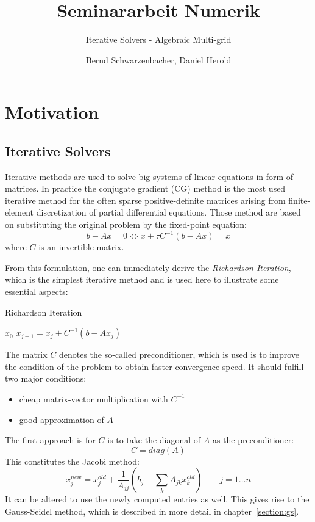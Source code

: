 \documentclass[a4paper,11pt]{scrartcl}
\title{Seminararbeit Numerik}
\subtitle{Iterative Solvers - Algebraic Multi-grid}
\author{Bernd Schwarzenbacher, Daniel Herold}
\begin{document}
\maketitle
\tableofcontents
\pagebreak

\section{Motivation} \label{section:motiv}
\subsection{Iterative Solvers} \label{section:iter}
Iterative methods are used to solve big systems of linear equations in form of
matrices.
In practice the conjugate gradient (CG) method is the most used iterative method for
the often sparse positive-definite matrices arising from finite-element
discretization of partial differential equations.
Those method are based on substituting the original problem by the fixed-point
equation:
$$b-Ax = 0 \iff x + \tau C^{-1} (b-Ax) = x$$
where $C$ is an invertible matrix.

From this formulation, one can immediately derive the
{\em Richardson Iteration}\/, which is the simplest iterative method and is
used here to illustrate some essential aspects:

\begin{algorithm}
\caption{Richardson Iteration}
\begin{algorithmic}
  \STATE {} \: $x_{0}$
    \STATE $x_{j+1} = x_{j} + C^{-1} (b - Ax_{j})$
  \ENDFOR
\end{algorithmic}
\end{algorithm}

The matrix $C$ denotes the so-called preconditioner, which is used is to
improve the condition of the problem to obtain faster convergence speed.
It should fulfill two major conditions:
\begin{itemize}
\item cheap matrix-vector multiplication with $C^{-1}$
\item good approximation of $A$
\end{itemize}

The first approach is for $C$ is to take the diagonal of $A$ as the
preconditioner:
$$C = diag(A)$$
This constitutes the Jacobi method:
$$ x_j^{new} = x_j^{old} + \frac{1}{A_{jj}} \left(b_{j} -
               \sum_{k} A_{jk} x_k^{old}\right)
               \qquad j = 1 \dots n$$
It can be altered to use the newly computed entries as well. This gives rise to
the Gauss-Seidel method, which is described in more detail in
chapter~\ref{section:gs}.
\cite{iterative}
\end{document}
